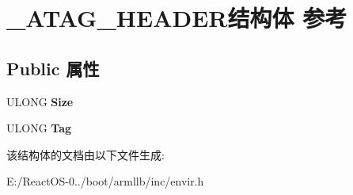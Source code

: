 \hypertarget{struct___a_t_a_g___h_e_a_d_e_r}{}\section{\+\_\+\+A\+T\+A\+G\+\_\+\+H\+E\+A\+D\+E\+R结构体 参考}
\label{struct___a_t_a_g___h_e_a_d_e_r}
\subsection*{Public 属性}
\begin{DoxyCompactItemize}
\item 
\mbox{\label{struct___a_t_a_g___h_e_a_d_e_r_ad3744426cd159402c117cd13d9082c64}} 
U\+L\+O\+NG {\bfseries Size}
\item 
\mbox{\label{struct___a_t_a_g___h_e_a_d_e_r_a54b0308ed775a75a5e77d6ae433a04e5}} 
U\+L\+O\+NG {\bfseries Tag}
\end{DoxyCompactItemize}


该结构体的文档由以下文件生成\+:\begin{DoxyCompactItemize}
\item 
E\+:/\+React\+O\+S-\/0../boot/armllb/inc/envir.\+h\end{DoxyCompactItemize}
